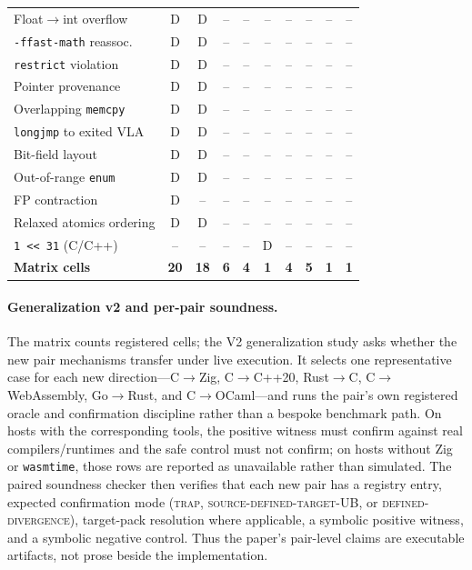 \documentclass[10pt,a4paper]{article}
\begin{document}
\begin{table}[t]
\begin{tabular}{@{}lccccccccc@{}}
Float$\to$int overflow     & D & D & -- & -- & -- & -- & -- & -- & -- \\
\texttt{-ffast-math} reassoc.& D & D & -- & -- & -- & -- & -- & -- & -- \\
\texttt{restrict} violation & D & D & -- & -- & -- & -- & -- & -- & -- \\
Pointer provenance         & D & D & -- & -- & -- & -- & -- & -- & -- \\
Overlapping \texttt{memcpy} & D & D & -- & -- & -- & -- & -- & -- & -- \\
\texttt{longjmp} to exited VLA & D & D & -- & -- & -- & -- & -- & -- & -- \\
Bit-field layout           & D & D & -- & -- & -- & -- & -- & -- & -- \\
Out-of-range \texttt{enum} & D & D & -- & -- & -- & -- & -- & -- & -- \\
FP contraction             & D & -- & -- & -- & -- & -- & -- & -- & -- \\
Relaxed atomics ordering   & D & D & -- & -- & -- & -- & -- & -- & -- \\
\texttt{1 << 31} (C/C++)   & -- & -- & -- & -- & D & -- & -- & -- & -- \\
\midrule
\textbf{Matrix cells}      & \textbf{20} & \textbf{18} & \textbf{6} & \textbf{4} & \textbf{1} & \textbf{4} & \textbf{5} & \textbf{1} & \textbf{1} \\
\bottomrule
\end{tabular}
\end{table}

\paragraph{Generalization v2 and per-pair soundness.}
The matrix counts registered cells; the V2 generalization study asks whether the
new pair mechanisms transfer under live execution. It selects one representative
case for each new direction---C$\to$Zig, C$\to$C++20, Rust$\to$C,
C$\to$WebAssembly, Go$\to$Rust, and C$\to$OCaml---and runs the pair's own
registered oracle and confirmation discipline rather than a bespoke benchmark
path. On hosts with the corresponding tools, the positive witness must confirm
against real compilers/runtimes and the safe control must not confirm; on hosts
without Zig or \texttt{wasmtime}, those rows are reported as unavailable rather
than simulated. The paired soundness checker then verifies that each new pair has
a registry entry, expected confirmation mode (\textsc{trap},
\textsc{source-defined-target-UB}, or \textsc{defined-divergence}), target-pack
resolution where applicable, a symbolic positive witness, and a symbolic negative
control. Thus the paper's pair-level claims are executable artifacts, not prose
beside the implementation.
\end{document}
